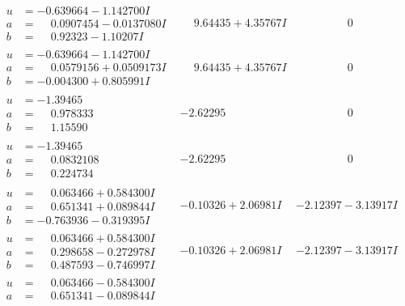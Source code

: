 \documentclass[1p]{elsarticle_modified}
\theoremstyle{definition}
\begin{document}
$$\begin{array}{c|c|c}
\begin{aligned}
u &= -0.639664 - 1.142700 I \\
a &= \phantom{-}0.0907454 - 0.0137080 I \\
b &= \phantom{-}0.92323 - 1.10207 I\end{aligned}
 & \phantom{-}9.64435 + 4.35767 I & \phantom{-0.000000 } 0 \\ \hline\begin{aligned}
u &= -0.639664 - 1.142700 I \\
a &= \phantom{-}0.0579156 + 0.0509173 I \\
b &= -0.004300 + 0.805991 I\end{aligned}
 & \phantom{-}9.64435 + 4.35767 I & \phantom{-0.000000 } 0 \\ \hline\begin{aligned}
u &= -1.39465\phantom{ +0.000000I} \\
a &= \phantom{-}0.978333\phantom{ +0.000000I} \\
b &= \phantom{-}1.15590\phantom{ +0.000000I}\end{aligned}
 & -2.62295\phantom{ +0.000000I} & \phantom{-0.000000 } 0 \\ \hline\begin{aligned}
u &= -1.39465\phantom{ +0.000000I} \\
a &= \phantom{-}0.0832108\phantom{ +0.000000I} \\
b &= \phantom{-}0.224734\phantom{ +0.000000I}\end{aligned}
 & -2.62295\phantom{ +0.000000I} & \phantom{-0.000000 } 0 \\ \hline\begin{aligned}
u &= \phantom{-}0.063466 + 0.584300 I \\
a &= \phantom{-}0.651341 + 0.089844 I \\
b &= -0.763936 - 0.319395 I\end{aligned}
 & -0.10326 + 2.06981 I & -2.12397 - 3.13917 I \\ \hline\begin{aligned}
u &= \phantom{-}0.063466 + 0.584300 I \\
a &= \phantom{-}0.298658 - 0.272978 I \\
b &= \phantom{-}0.487593 - 0.746997 I\end{aligned}
 & -0.10326 + 2.06981 I & -2.12397 - 3.13917 I \\ \hline\begin{aligned}
u &= \phantom{-}0.063466 - 0.584300 I \\
a &= \phantom{-}0.651341 - 0.089844 I \\

\end{aligned}
\end{array}$$
\end{document}
